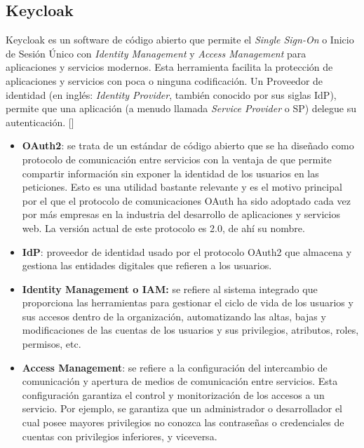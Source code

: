 \subsection*{Keycloak}
Keycloak es un software de código abierto que permite el \textit{Single Sign-On} o Inicio de Sesión Único con \textit{Identity Management} y \textit{Access Management} para aplicaciones y servicios modernos. Esta herramienta facilita la protección de aplicaciones y servicios con poca o ninguna codificación. Un Proveedor de identidad (en inglés: \textit{Identity Provider}, también conocido por sus siglas IdP), permite que una aplicación (a menudo llamada \textit{Service Provider} o SP) delegue su autenticación. [\cite{KeycloakDoc}]

\begin{itemize}
	\item \textbf{OAuth2}: se trata de un estándar de código abierto que se ha diseñado como protocolo de comunicación entre servicios con la ventaja de que permite compartir información sin exponer la identidad de los usuarios en las peticiones. Esto es una utilidad bastante relevante y es el motivo principal por el que el protocolo de comunicaciones OAuth ha sido adoptado cada vez por más empresas en la industria del desarrollo de aplicaciones y servicios web. La versión actual de este protocolo es 2.0, de ahí su nombre.
	
	\item \textbf{IdP}: proveedor de identidad usado por el protocolo OAuth2 que almacena y gestiona las entidades digitales que refieren a los usuarios.
	
	\item \textbf{Identity Management o IAM: }se refiere al sistema integrado que proporciona las herramientas para gestionar el ciclo de vida de los usuarios y sus accesos dentro de la organización, automatizando las altas, bajas y modificaciones de las cuentas de los usuarios y sus privilegios, atributos, roles, permisos, etc.
	
	\item \textbf{Access Management}: se refiere a la configuración del intercambio de comunicación y apertura de medios de comunicación entre servicios. Esta configuración garantiza el control y monitorización de los accesos a un servicio. Por ejemplo, se garantiza que un administrador o desarrollador el cual posee mayores privilegios no conozca las contraseñas o credenciales de cuentas con privilegios inferiores, y viceversa. 
\end{itemize}


